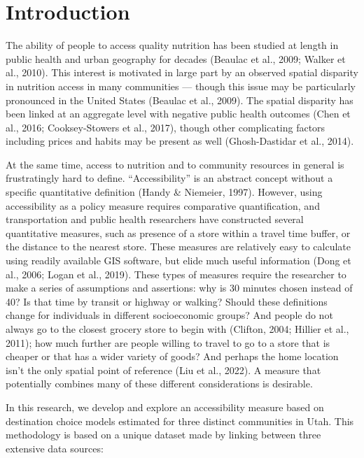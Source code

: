 \documentclass[
  letterpaper,
  number,
  review,
  3p]{elsarticle}
\begin{document}

\section{Introduction}\label{introduction}

The ability of people to access quality nutrition has been studied at
length in public health and urban geography for decades (Beaulac et al.,
2009; Walker et al., 2010). This interest is motivated in large part by
an observed spatial disparity in nutrition access in many communities
--- though this issue may be particularly pronounced in the United
States (Beaulac et al., 2009). The spatial disparity has been linked at
an aggregate level with negative public health outcomes (Chen et al.,
2016; Cooksey-Stowers et al., 2017), though other complicating factors
including prices and habits may be present as well (Ghosh-Dastidar et
al., 2014).

At the same time, access to nutrition and to community resources in
general is frustratingly hard to define. ``Accessibility'' is an
abstract concept without a specific quantitative definition (Handy \&
Niemeier, 1997). However, using accessibility as a policy measure
requires comparative quantification, and transportation and public
health researchers have constructed several quantitative measures, such
as presence of a store within a travel time buffer, or the distance to
the nearest store. These measures are relatively easy to calculate using
readily available GIS software, but elide much useful information (Dong
et al., 2006; Logan et al., 2019). These types of measures require the
researcher to make a series of assumptions and assertions: why is 30
minutes chosen instead of 40? Is that time by transit or highway or
walking? Should these definitions change for individuals in different
socioeconomic groups? And people do not always go to the closest grocery
store to begin with (Clifton, 2004; Hillier et al., 2011); how much
further are people willing to travel to go to a store that is cheaper or
that has a wider variety of goods? And perhaps the home location isn't
the only spatial point of reference (Liu et al., 2022). A measure that
potentially combines many of these different considerations is
desirable.

In this research, we develop and explore an accessibility measure based
on destination choice models estimated for three distinct communities in
Utah. This methodology is based on a unique dataset made by linking
between three extensive data sources:
\end{document}
